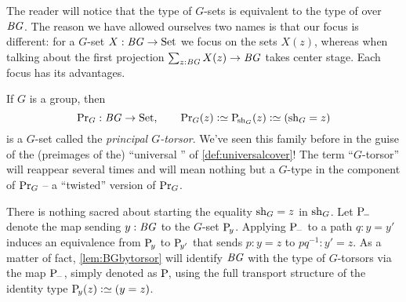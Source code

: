 \begin{remark}
  The reader will notice that the type of $G$-sets is equivalent to the 
type of \coverings over $\mathit{B}\mathit{G}$. %
The reason we have allowed ourselves two names is that our focus is different: for a $G$-set $X:\mathit{B}\mathit{G}\to\mathrm{Set}$ we focus on the sets $X(z)$, whereas when talking about \coverings the first projection $\sum_{z:\mathit{B}\mathit{G}}X(z)\to \mathit{B}\mathit{G}$ takes center stage.  Each focus has its advantages.

\end{remark}

\begin{example}\label{def:principaltorsor}
  If $G$ is a group, then
$$\princ G:\BG\to\Set,\qquad\princ G(z)\defequi\pathsp{\sh_G}(z)\defequi(\sh_G=z)$$ is a $G$-set called the \emph{principal $G$-torsor}.  
We've seen this family before in the guise of the (preimages of the) ``universal \covering'' of \cref{def:universalcover}!  
The term ``$G$-torsor'' will reappear several times and will mean nothing but a $G$-type in the component of $\mathrm{Pr}_{{G}}$ -- a ``twisted'' version of $\mathrm{Pr}_{{G}}$.

There is nothing sacred about starting the equality $\mathrm{sh}_G = z$ in $\mathrm{sh}_G$. 
Let $\mathrm{P}_{\!{-}}$ denote the map sending $y:\mathit{B}\mathit{G}$ to the $G$-set $\mathrm{P}_{\!y}$. 
Applying $\mathrm{P}_{\!{-}}$ to a path $q:y=y'$
induces an equivalence from $\mathrm{P}_{\!y}$ to $\mathrm{P}_{\!y'}$ that sends $p:y=z$ to $pq^{-1}:y'=z$. As a matter of fact, \cref{lem:BGbytorsor} will identify $\mathit{B}\mathit{G}$ with the type of $G$-torsors via the map $\mathrm{P}_{\!{-}}$, simply denoted as $\mathrm{P}_{\!}$,
using the full transport structure of the identity type $\pathsp y(z)\defequi(y=z)$.
 
\end{example}

